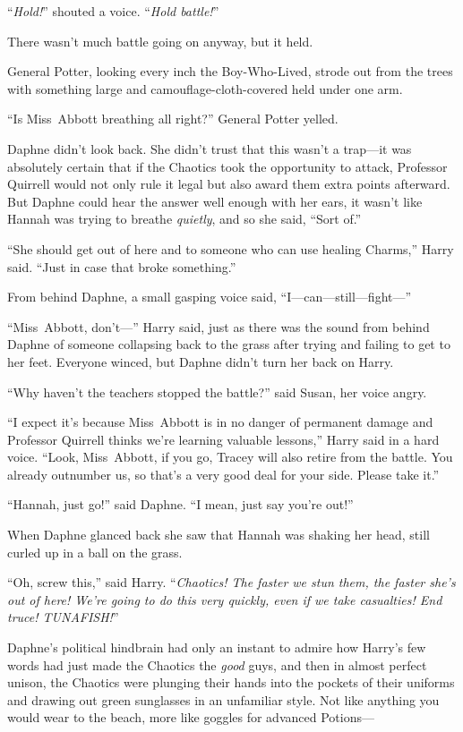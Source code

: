 “\emph{Hold!}” shouted a voice. “\emph{Hold battle!}”

There wasn’t much battle going on anyway, but it held.

General Potter, looking every inch the Boy-Who-Lived, strode out from the trees with something large and camouflage-cloth-covered held under one arm.

“Is Miss~Abbott breathing all right?” General Potter yelled.

Daphne didn’t look back. She didn’t trust that this wasn’t a trap—it was absolutely certain that if the Chaotics took the opportunity to attack, Professor Quirrell would not only rule it legal but also award them extra points afterward. But Daphne could hear the answer well enough with her ears, it wasn’t like Hannah was trying to breathe \emph{quietly}, and so she said, “Sort of.”

“She should get out of here and to someone who can use healing Charms,” Harry said. “Just in case that broke something.”

From behind Daphne, a small gasping voice said, “I—can—still—fight—”

“Miss~Abbott, don’t—” Harry said, just as there was the sound from behind Daphne of someone collapsing back to the grass after trying and failing to get to her feet. Everyone winced, but Daphne didn’t turn her back on Harry.

“Why haven’t the teachers stopped the battle?” said Susan, her voice angry.

“I expect it’s because Miss~Abbott is in no danger of permanent damage and Professor Quirrell thinks we’re learning valuable lessons,” Harry said in a hard voice. “Look, Miss~Abbott, if you go, Tracey will also retire from the battle. You already outnumber us, so that’s a very good deal for your side. Please take it.”

“Hannah, just go!” said Daphne. “I mean, just say you’re out!”

When Daphne glanced back she saw that Hannah was shaking her head, still curled up in a ball on the grass.

“Oh, screw this,” said Harry. “\emph{Chaotics! The faster we stun them, the faster she’s out of here! We’re going to do this very quickly, even if we take casualties! End truce! TUNAFISH!}”

Daphne’s political hindbrain had only an instant to admire how Harry’s few words had just made the Chaotics the \emph{good} guys, and then in almost perfect unison, the Chaotics were plunging their hands into the pockets of their uniforms and drawing out green sunglasses in an unfamiliar style. Not like anything you would wear to the beach, more like goggles for advanced Potions—


